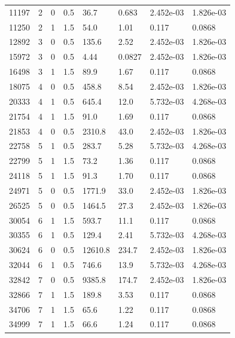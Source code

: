 \documentclass[preview]{standalone}
\begin{document}
{{\begin{tabular}{L{1.2cm}C{1.2cm} C{0.3cm}C{0.5cm} C{1.4cm}C{1.4cm} C{1.4cm}C{1.4cm}}
  11197  &     2  & 0     & 0.5 &  36.7  & 0.683  & 2.452e-03 &  1.826e-03   \\ 
  11250  &     2  & 1     & 1.5 &  54.0  & 1.01  & 0.117 &  0.0868   \\ 
  12892  &     3  & 0     & 0.5 &  135.6  & 2.52  & 2.452e-03 &  1.826e-03   \\ 
  15972  &     3  & 0     & 0.5 &  4.44  & 0.0827  & 2.452e-03 &  1.826e-03   \\ 
  16498  &     3  & 1     & 1.5 &  89.9  & 1.67  & 0.117 &  0.0868   \\ 
  18075  &     4  & 0     & 0.5 &  458.8  & 8.54  & 2.452e-03 &  1.826e-03   \\ 
  20333  &     4  & 1     & 0.5 &  645.4  & 12.0  & 5.732e-03 &  4.268e-03   \\ 
  21754  &     4  & 1     & 1.5 &  91.0  & 1.69  & 0.117 &  0.0868   \\ 
  21853  &     4  & 0     & 0.5 &  2310.8  & 43.0  & 2.452e-03 &  1.826e-03   \\ 
  22758  &     5  & 1     & 0.5 &  283.7  & 5.28  & 5.732e-03 &  4.268e-03   \\ 
  22799  &     5  & 1     & 1.5 &  73.2  & 1.36  & 0.117 &  0.0868   \\ 
  24118  &     5  & 1     & 1.5 &  91.3  & 1.70  & 0.117 &  0.0868   \\ 
  24971  &     5  & 0     & 0.5 &  1771.9  & 33.0  & 2.452e-03 &  1.826e-03   \\ 
  26525  &     5  & 0     & 0.5 &  1464.5  & 27.3  & 2.452e-03 &  1.826e-03   \\ 
  30054  &     6  & 1     & 1.5 &  593.7  & 11.1  & 0.117 &  0.0868   \\ 
  30355  &     6  & 1     & 0.5 &  129.4  & 2.41  & 5.732e-03 &  4.268e-03   \\ 
  30624  &     6  & 0     & 0.5 &  12610.8  & 234.7  & 2.452e-03 &  1.826e-03   \\ 
  32044  &     6  & 1     & 0.5 &  746.6  & 13.9  & 5.732e-03 &  4.268e-03   \\ 
  32842  &     7  & 0     & 0.5 &  9385.8  & 174.7  & 2.452e-03 &  1.826e-03   \\ 
  32866  &     7  & 1     & 1.5 &  189.8  & 3.53  & 0.117 &  0.0868   \\ 
  34706  &     7  & 1     & 1.5 &  65.6  & 1.22  & 0.117 &  0.0868   \\ 
  34999  &     7  & 1     & 1.5 &  66.6  & 1.24  & 0.117 &  0.0868   \\ 

\end{tabular}}}
\end{document}
